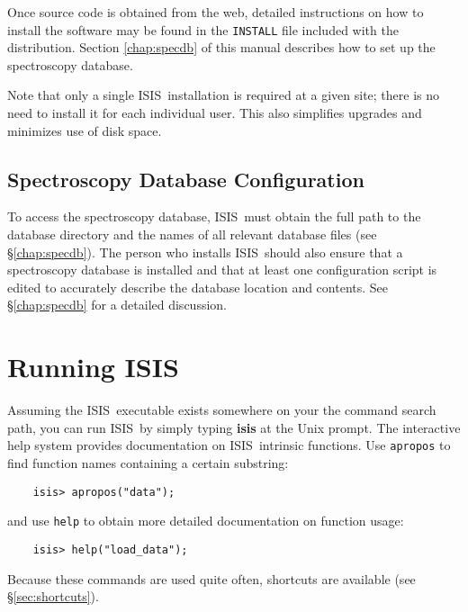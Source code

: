 \documentclass{book}
\newcommand{\isisx}{{\sc ISIS~}}
\begin{document}
Once source code is obtained from the web, detailed instructions
on how to install the software may be found in the {\tt INSTALL}
file included with the distribution.  Section \ref{chap:specdb} of
this manual describes how to set up the spectroscopy database.

Note that only a single \isisx installation is required at a given site;
there is no need to install it for each individual user.  This also
simplifies upgrades and minimizes use of disk space.

\subsection{Spectroscopy Database Configuration}

To access the spectroscopy database, \isisx must obtain the full
path to the database directory and the names of all relevant
database files (see \S \ref{chap:specdb}). The person who installs
\isisx should also ensure that a spectroscopy database is
installed and that at least one configuration script is edited to
accurately describe the database location and contents. See
\S\ref{chap:specdb} for a detailed discussion.

\vfill

\section{Running ISIS}
\label{sec:running}

Assuming the \isisx executable exists somewhere on your the
command search path, you can run \isisx by simply typing {\bf isis}
at the Unix prompt.  The interactive help system provides
documentation on \isisx intrinsic functions.  Use {\tt apropos} to
find function names containing a certain substring:
\begin{verbatim}
    isis> apropos("data");
\end{verbatim}
and use {\tt help} to obtain more detailed documentation on
function usage:
\begin{verbatim}
    isis> help("load_data");
\end{verbatim}
Because these commands are used quite often, shortcuts are
available (see \S\ref{sec:shortcuts}).

\label{about-semicolons}
\end{document}
